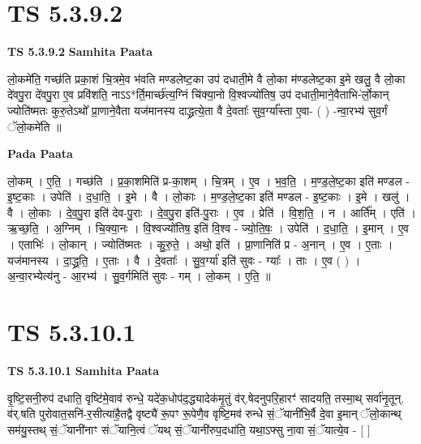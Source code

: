 \documentclass[17pt]{extarticle}
\begin{document}
\section*{ TS 5.3.9.2 }

\textbf{TS 5.3.9.2 } \newline
\textbf{Samhita Paata} \newline

लो॒कमे॑ति॒ गच्छ॑ति प्रका॒शं चि॒त्रमे॒व भ॑वति मण्डलेष्ट॒का उप॑ दधाती॒मे वै लो॒का म॑ण्डलेष्ट॒का इ॒मे खलु॒ वै लो॒का दे॑वपु॒रा दे॑वपु॒रा ए॒व प्रवि॑शति॒ नाऽऽ*र्ति॒मार्च्छ॑त्य॒ग्निं चि॑क्या॒नो वि॒श्वज्यो॑तिष॒ उप॑ दधाती॒माने॒वैताभि-॑र्लो॒कान् ज्योति॑ष्मतः कुरु॒तेऽथो᳚ प्रा॒णाने॒वैता यज॑मानस्य दाद्ध्रत्ये॒ता वै दे॒वताः᳚ सुव॒र्ग्या᳚स्ता ए॒वा- ( ) -न्वा॒रभ्य॑ सुव॒र्गं ॅलो॒कमे॑ति ॥ \newline

\textbf{Pada Paata} \newline

लो॒कम् । ए॒ति॒ । गच्छ॑ति । प्र॒का॒शमिति॑ प्र-का॒शम् । चि॒त्रम् । ए॒व । भ॒व॒ति॒ । म॒ण्ड॒ले॒ष्ट॒का इति॑ मण्डल - इ॒ष्ट॒काः । उपेति॑ । द॒धा॒ति॒ । इ॒मे । वै । लो॒काः । म॒ण्ड॒ले॒ष्ट॒का इति॑ मण्डल - इ॒ष्ट॒काः । इ॒मे । खलु॑ । वै । लो॒काः । दे॒व॒पु॒रा इति॑ देव-पु॒राः । दे॒व॒पु॒रा इति॑-पु॒राः । ए॒व । प्रेति॑ । वि॒श॒ति॒ । न । आर्ति᳚म् । एति॑ । ऋ॒च्छ॒ति॒ । अ॒ग्निम् । चि॒क्या॒नः । वि॒श्वज्यो॑तिष॒ इति॑ वि॒श्व - ज्यो॒ति॒षः॒ । उपेति॑ । द॒धा॒ति॒ । इ॒मान् । ए॒व । एताभिः॑ । लो॒कान् । ज्योति॑ष्मतः । कु॒रु॒ते॒ । अथो॒ इति॑ । प्रा॒णानिति॑ प्र - अ॒नान् । ए॒व । ए॒ताः । यज॑मानस्य । दा॒द्ध्र॒ति॒ । ए॒ताः । वै । दे॒वताः᳚ । सु॒व॒र्ग्या॑ इति॑ सुवः - ग्याः᳚ । ताः । ए॒व ( ) । अ॒न्वा॒रभ्येत्य॑नु - आ॒रभ्य॑ । सु॒व॒र्गमिति॑ सुवः - गम् । लो॒कम् । ए॒ति॒ ॥  \newline




\section*{ TS 5.3.10.1 }

\textbf{TS 5.3.10.1 } \newline
\textbf{Samhita Paata} \newline

वृ॒ष्टि॒सनी॒रुप॑ दधाति॒ वृष्टि॑मे॒वाव॑ रुन्धे॒ यदे॑क॒धोप॑द॒द्ध्यादेक॑मृ॒तुं व॑र्.षेदनुपरि॒हारꣳ॑ सादयति॒ तस्मा॒थ् सर्वा॑नृ॒तून्. व॑र्.षति पुरोवात॒सनि॑-र॒सीत्या॑है॒तद्वै वृष्ट्यै॑ रू॒पꣳ रू॒पेणै॒व वृष्टि॒मव॑ रुन्धे सं॒ॅयानी॑भि॒र्वै दे॒वा इ॒मान् ॅलो॒कान्थ् सम॑यु॒स्तथ् सं॒ॅयानी॑नाꣳ संॅयानि॒त्वं ॅयथ् सं॒ॅयानी॑रुप॒दधा॑ति॒ यथा॒ऽफ्सु ना॒वा सं॒ॅयात्ये॒व - [  ] \newline
\end{document}
